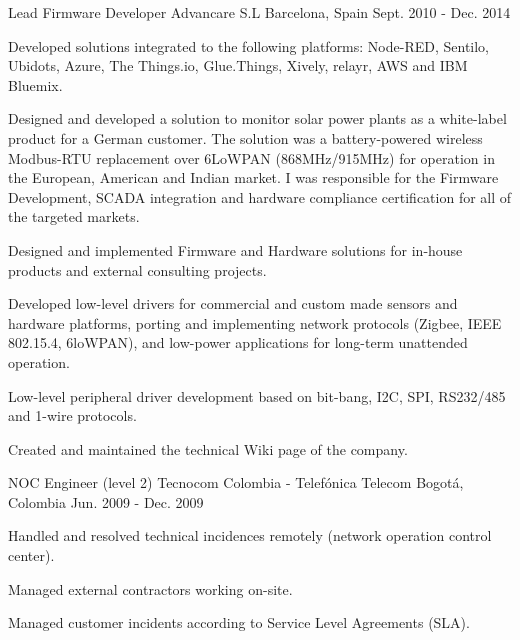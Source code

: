 \begin{cventries}
  \cventry
    {Lead Firmware Developer} %
    {Advancare S.L} %
    {Barcelona, Spain} %
    {Sept. 2010 - Dec. 2014} %
    {
      \begin{cvitems} %
        \item {Developed solutions integrated to the following platforms: Node-RED, Sentilo, Ubidots, Azure, The Things.io, Glue.Things, Xively, relayr, AWS and IBM Bluemix.}
        \item {Designed and developed a solution to monitor solar power plants as a white-label product for a German customer.  The solution was a battery-powered wireless Modbus-RTU replacement over 6LoWPAN (868MHz/915MHz) for operation in the European, American and Indian market.  I was responsible for the Firmware Development, SCADA integration and hardware compliance certification for all of the targeted markets.}
        \item {Designed and implemented Firmware and Hardware solutions for in-house products and external consulting projects.}
        \item {Developed low-level drivers for commercial and custom made sensors and hardware platforms, porting and implementing network protocols (Zigbee, IEEE 802.15.4, 6loWPAN), and low-power applications for long-term unattended operation.}
        \item {Low-level peripheral driver development based on bit-bang, I2C, SPI, RS232/485 and 1-wire protocols.}
        \item {Created and maintained the technical Wiki page of the company.}
      \end{cvitems}
    }

\end{cventries}


\begin{cventries}

  \cventry
    {NOC Engineer (level 2)} %
    {Tecnocom Colombia - Telefónica Telecom} %
    {Bogotá, Colombia} %
    {Jun. 2009 - Dec. 2009} %
    {
      \begin{cvitems} %
        \item {Handled and resolved technical incidences remotely (network operation control center).}
        \item {Managed external contractors working on-site.}
        \item {Managed customer incidents according to Service Level Agreements (SLA).}        
      \end{cvitems}
    }

\end{cventries}

